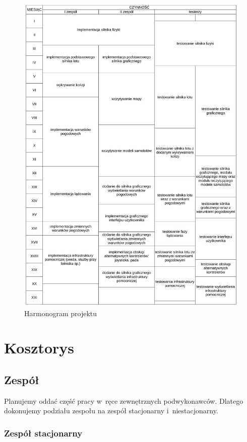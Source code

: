 \documentclass{mwrep}
\begin{document}
\begin{figure}[!h]
	\centerline{\includegraphics*[scale=0.8]{harmonogram-tabela.pdf}}
	\caption{Harmonogram projektu}
\end{figure}

\chapter{Kosztorys}

\section{Zespół}

Planujemy oddać część pracy w~ręce zewnętrznych podwykonawców. Dlatego dokonujemy podziału zespołu na zespół stacjonarny i~niestacjonarny.

\subsection{Zespół stacjonarny}
\end{document}
